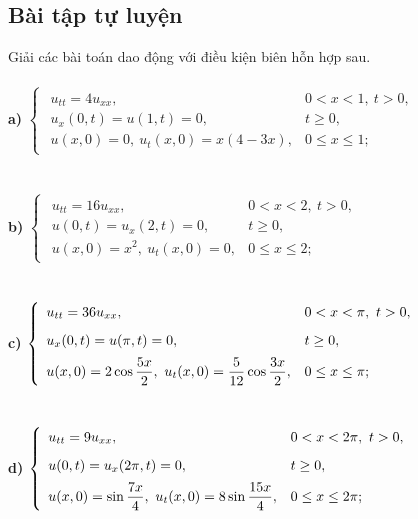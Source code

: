 \documentclass[10pt, a4paper]{article}
\begin{document}
	\subsection{Bài tập tự luyện}
	Giải các bài toán dao động với điều kiện biên hỗn hợp sau.\\\\
	\textbf{a) }$\begin{cases}
		\begin{array}{ll}
			u_{tt}=4u_{xx}, & 0<x<1,~t>0,\\
			u_x(0,t)=u(1,t)=0, & t\ge0,\\
			u(x,0)=0,~u_t(x,0)=x(4-3x), & 0\le x\le1;
		\end{array}
	\end{cases}$\\\\\\
	\textbf{b) }$\begin{cases}
		\begin{array}{ll}
			u_{tt}=16u_{xx}, & 0<x<2,~t>0,\\
			u(0,t)=u_x(2,t)=0, & t\ge0,\\
			u(x,0)=x^2,~u_t(x,0)=0, & 0\le x\le2;
		\end{array}
	\end{cases}$\\\\\\
	\textbf{c) }$\begin{cases}
		\begin{array}{ll}
			u_{tt}=36u_{xx}, & 0<x<\pi,~t>0,\\
			\noalign{\vskip6pt}
			u_x(0,t)=u(\pi,t)=0, & t\ge0,\\
			\noalign{\vskip5pt}
			u(x,0)=2\cos\dfrac{5x}{2},~u_t(x,0)=\dfrac{5}{12}\cos\dfrac{3x}{2}, & 0\le x\le\pi;
		\end{array}
	\end{cases}$\\\\\\
	\textbf{d) }$\begin{cases}
		\begin{array}{ll}
			u_{tt}=9u_{xx}, & 0<x<2\pi,~t>0,\\
			\noalign{\vskip6pt}
			u(0,t)=u_x(2\pi,t)=0, & t\ge0,\\
			\noalign{\vskip5pt}
			u(x,0)=\sin\dfrac{7x}{4},~u_t(x,0)=8\sin\dfrac{15x}{4}, & 0\le x\le2\pi;
		\end{array}
	\end{cases}$\\\\\\
\end{document}
